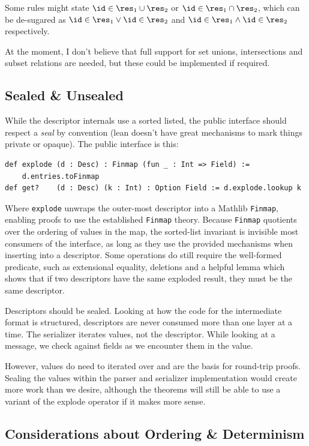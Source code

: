 Some rules might state $\id \in \res_1 \cup \res_2$ or $\id \in \res_1 \cap \res_2$, which
can be de-sugared as $\id \in \res_1 \vee \id \in \res_2$ and $\id \in \res_1 \wedge \id \in
\res_2$ respectively.

At the moment, I don't believe that full support for set unions, intersections
and subset relations are needed, but these could be implemented if required.

\subsection{Sealed \& Unsealed}

While the descriptor internals use a sorted listed, the public interface should
respect a \emph{seal} by convention (lean doesn't have great mechanisms to mark
things private or opaque). The public interface is this: 

\begin{verbatim}
def explode (d : Desc) : Finmap (fun _ : Int => Field) :=
    d.entries.toFinmap
def get?    (d : Desc) (k : Int) : Option Field := d.explode.lookup k
\end{verbatim}

Where \texttt{explode} unwraps the outer-most descriptor into a Mathlib
\texttt{Finmap}, enabling proofs to use the established \texttt{Finmap}
theory. Because \texttt{Finmap} quotients over the ordering of values in the
map, the sorted-list invariant is invisible most consumers of the interface, as
long as they use the provided mechanisms when inserting into a descriptor. Some
operations do still require the well-formed predicate, such as extensional
equality, deletions and a helpful lemma which shows that if two descriptors have
the same exploded result, they must be the same descriptor.

Descriptors should be sealed. Looking at how the code for the intermediate
format is structured, descriptors are never consumed more than one layer at a
time. The serializer iterates values, not the descriptor. While looking at a
message, we check against fields as we encounter them in the value.

However, values do need to iterated over and are the basis for round-trip
proofs. Sealing the values within the parser and serializer implementation would
create more work than we desire, although the theorems will still be able to use
a variant of the explode operator if it makes more sense.

\subsection{Considerations about Ordering \& Determinism}

